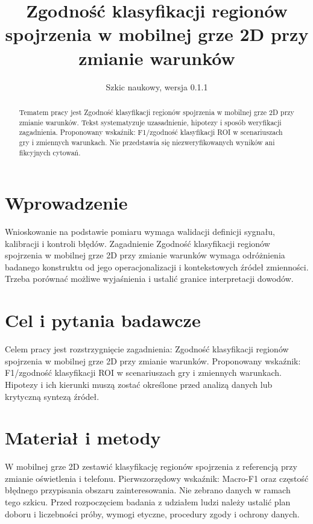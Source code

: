 \documentclass[11pt,a4paper]{article}
\title{Zgodność klasyfikacji regionów spojrzenia w mobilnej grze 2D przy zmianie warunków}
\author{}
\date{Szkic naukowy, wersja 0.1.1}
\begin{document}
\maketitle

\begin{abstract}

Tematem pracy jest Zgodność klasyfikacji regionów spojrzenia w mobilnej grze 2D przy zmianie warunków. Tekst systematyzuje uzasadnienie, hipotezy i sposób weryfikacji zagadnienia. Proponowany wskaźnik: F1/zgodność klasyfikacji ROI w scenariuszach gry i zmiennych warunkach. Nie przedstawia się niezweryfikowanych wyników ani fikcyjnych cytowań.

\end{abstract}

\section{Wprowadzenie}

Wnioskowanie na podstawie pomiaru wymaga walidacji definicji sygnału, kalibracji i kontroli błędów. Zagadnienie Zgodność klasyfikacji regionów spojrzenia w mobilnej grze 2D przy zmianie warunków wymaga odróżnienia badanego konstruktu od jego operacjonalizacji i kontekstowych źródeł zmienności. Trzeba porównać możliwe wyjaśnienia i ustalić granice interpretacji dowodów.

\section{Cel i pytania badawcze}

Celem pracy jest rozstrzygnięcie zagadnienia: Zgodność klasyfikacji regionów spojrzenia w mobilnej grze 2D przy zmianie warunków. Proponowany wskaźnik: F1/zgodność klasyfikacji ROI w scenariuszach gry i zmiennych warunkach. Hipotezy i ich kierunki muszą zostać określone przed analizą danych lub krytyczną syntezą źródeł.

\section{Materiał i metody}

W mobilnej grze 2D zestawić klasyfikację regionów spojrzenia z referencją przy zmianie oświetlenia i telefonu. Pierwszorzędowy wskaźnik: Macro-F1 oraz częstość błędnego przypisania obszaru zainteresowania. Nie zebrano danych w ramach tego szkicu. Przed rozpoczęciem badania z udziałem ludzi należy ustalić plan doboru i liczebności próby, wymogi etyczne, procedury zgody i ochrony danych.
\end{document}
